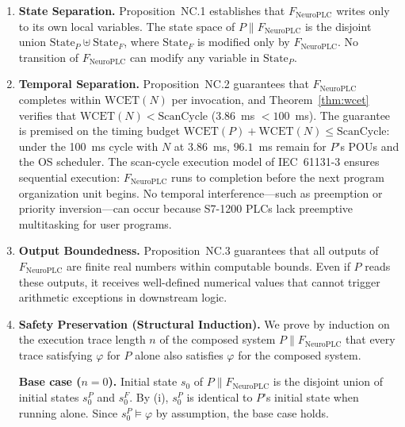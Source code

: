 \begin{enumerate}[label=(\roman*)]
    \item \textbf{State Separation.}
    Proposition~NC.1 establishes that
    $F_{\text{NeuroPLC}}$ writes only to its own local variables.
    The state space of $P \parallel F_{\text{NeuroPLC}}$ is the
    disjoint union $\text{State}_P \uplus \text{State}_F$, where
    $\text{State}_F$ is modified only by $F_{\text{NeuroPLC}}$.
    No transition of $F_{\text{NeuroPLC}}$ can modify any variable
    in $\text{State}_P$.

    \item \textbf{Temporal Separation.}
    Proposition~NC.2 guarantees that
    $F_{\text{NeuroPLC}}$ completes within $\text{WCET}(N)$ per
    invocation, and Theorem~\ref{thm:wcet} verifies that
    $\text{WCET}(N) < \text{ScanCycle}$ ($3.86$~ms $< 100$~ms).
    The guarantee is premised on the timing budget
    $\text{WCET}(P) + \text{WCET}(N) \leq \text{ScanCycle}$: under the
    100~ms cycle with $N$ at $3.86$~ms, $96.1$~ms remain for $P$'s
    POUs and the OS scheduler. The scan-cycle execution model of
    IEC~61131-3 ensures
    sequential execution: $F_{\text{NeuroPLC}}$ runs to completion
    before the next program organization unit begins. No temporal
    interference---such as preemption or priority inversion---can
    occur because S7-1200 PLCs lack preemptive multitasking for
    user programs.

    \item \textbf{Output Boundedness.}
    Proposition~NC.3 guarantees that all
    outputs of $F_{\text{NeuroPLC}}$ are finite real numbers within
    computable bounds. Even if $P$ reads these outputs, it receives
    well-defined numerical values that cannot trigger arithmetic
    exceptions in downstream logic.

    \item \textbf{Safety Preservation (Structural Induction).}
    We prove by induction on the execution trace length $n$ of the
    composed system $P \parallel F_{\text{NeuroPLC}}$ that every
    trace satisfying $\varphi$ for $P$ alone also satisfies $\varphi$
    for the composed system.

    \textbf{Base case ($n=0$).} Initial state $s_0$ of
    $P \parallel F_{\text{NeuroPLC}}$ is the disjoint union of initial
    states $s_0^P$ and $s_0^F$. By (i), $s_0^P$ is identical to
    $P$'s initial state when running alone. Since $s_0^P \models
    \varphi$ by assumption, the base case holds.


\end{enumerate}
